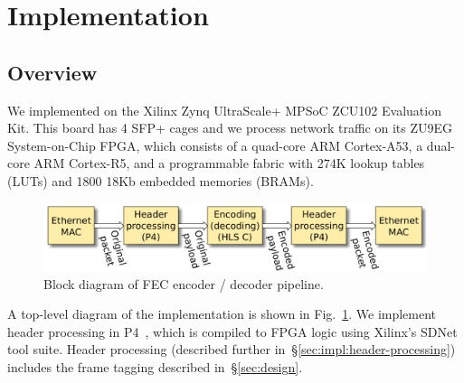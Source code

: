 \section{Implementation}
\label{sec:implementation}

\newcommand{\leicom}[1]{{\color{blue}{[\textbf{Lei Comment:} #1]}}}
\newcommand{\hg}[1]{{\color{green}{[\textbf{Hans Comment:} #1]}}}

\subsection{Overview}
We implemented \OurSys
on the Xilinx Zynq UltraScale+ MPSoC ZCU102 Evaluation Kit.  This board has 4 SFP+ cages and we process network traffic on its
ZU9EG System-on-Chip FPGA, which consists of a quad-core ARM Cortex-A53, a
dual-core ARM Cortex-R5, and a programmable fabric with 274K lookup tables
(LUTs) and 1800 18Kb embedded memories (BRAMs).

\begin{figure}
  \centering
  \includegraphics[width=0.4\paperwidth]{Top_level.pdf}
  \caption{\label{fig:toplevel} Block diagram of FEC encoder / decoder pipeline.
  }
\end{figure}

A top-level diagram of the implementation is shown in Fig.~\ref{fig:toplevel}.
%
We implement header processing in
P4~\cite{Bosshart:2014:PPP:2656877.2656890}, which is compiled to FPGA
logic using Xilinx's SDNet tool suite.  Header processing (described
further in~\S\ref{sec:impl:header-processing}) includes the frame
tagging described in~\S\ref{sec:design}.

